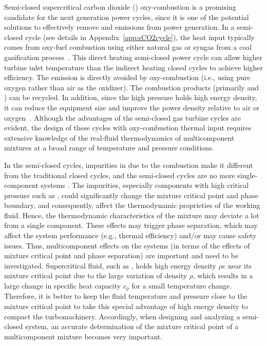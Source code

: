 Semi-closed supercritical carbon dioxide () oxy-combustion is a promising candidate for the next generation power cycles, since it is one of the potential solutions to effectively remove  and  emissions from power generation. 
In a semi-closed  cycle (see details in Appendix~\ref{app:sCO2cycle}), the heat input typically comes from oxy-fuel combustion using either natural gas or syngas from a coal gasification process~\citep{mcclung2015comparison}. This direct heating semi-closed  power cycle can allow higher turbine inlet temperature than the indirect heating closed  cycles to achieve higher efficiency.
The  emission is directly avoided by oxy-combustion (i.e., using pure oxygen rather than air as the oxidizer). The combustion products (primarily  and ) can be recycled. 
In addition, since the high pressure  holds high energy density, it can reduce the equipment size and improve the power density relative to air or oxygen~\citep{dostal2004supercritical,ahn2015review}. Although the advantages of the semi-closed  gas turbine cycles are evident, the design of these cycles with oxy-combustion thermal input requires extensive knowledge of the real-fluid thermodynamics of multicomponent mixtures at a broad range of temperature and pressure conditions.

In the semi-closed  cycles, impurities in  due to the combustion make it different from the traditional closed  cycles, and the semi-closed  cycles are no more single-component systems \cite{abdul2017cfd,barak2020ignition}. The impurities, especially components with high critical pressure such as , could significantly change the mixture critical point and phase boundary, and consequently, affect the thermodynamic proprieties of the working fluid. Hence, the thermodynamic characteristics of the mixture may deviate a lot from a single component. These effects may trigger phase separation, which may affect the system performance (e.g., thermal efficiency) and/or may cause safety issues. Thus, multicomponent effects on the  systems (in terms of the effects of mixture critical point and phase separation) are important and need to be investigated. Supercritical fluid, such as , holds high energy density $\rho e$ near its mixture critical point due to the large variation of density $\rho$, which results in a large change in specific heat capacity $c_p$ for a small temperature change. Therefore, it is better to keep the fluid temperature and pressure close to the mixture critical point to take this special advantage of high energy density to compact the turbomachinery. Accordingly, when designing and analyzing a semi-closed  system, an accurate determination of the mixture critical point of a multicomponent mixture becomes very important.

